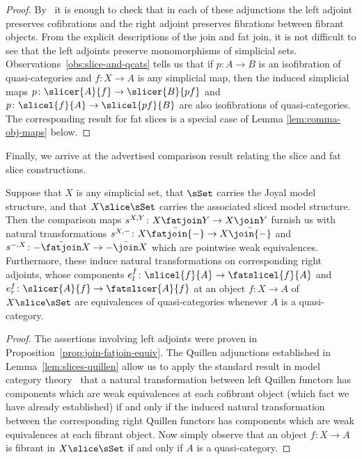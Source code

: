   \begin{proof}
    By~\cite[7.15]{Joyal:2007kk} it is enough to check that in each of these adjunctions the left adjoint preserves cofibrations and the right adjoint preserves fibrations between fibrant objects. From the explicit descriptions of the join and fat join, it is not difficult to see that the left adjoints preserve monomorphisms of simplicial sets. Observations~\ref{obs:slice-and-qcats} tells us that if $p \colon A \to B$ is an isofibration of quasi-categories and $f \colon X \to A$ is any simplicial map, then the induced simplicial maps $p\colon \slicer{A}{f}\to \slicer{B}{pf}$ and $p\colon \slicel{f}{A}\to \slicel{pf}{B}$ are also isofibrations of quasi-categories. The corresponding result for fat slices is a special case of Lemma \ref{lem:comma-obj-maps} below.%
  \end{proof}

  Finally, we arrive at the advertised comparison result relating the slice and fat slice constructions.
  
  \begin{prop}\label{prop:slice-fatslice-equiv}
    Suppose that $X$ is any simplicial set, that $\sSet$ carries the Joyal model structure, and that $X\slice\sSet$ carries the associated sliced model structure. Then the comparison maps $s^{X,Y}\colon X\fatjoin Y\to X\join Y$ furnish us with natural transformations $s^{X,{-}}\colon X\bar\fatjoin{-}\to X\bar\join{-}$ and $s^{{-},X}\colon {-}\bar\fatjoin X\to {-}\bar\join X$ which are pointwise weak equivalences. Furthermore, these induce natural transformations  on corresponding right adjoints, whose components $e_l^f\colon \slicel{f}{A}\to \fatslicel{f}{A} $ and $e_r^f\colon \slicer{A}{f}\to \fatslicer{A}{f}$ at an object $f\colon X\to A$ of $X\slice\sSet$ are equivalences of quasi-categories whenever $A$ is a quasi-category.
  \end{prop}
  
  \begin{proof}
    The assertions involving left adjoints were proven in Proposition~\ref{prop:join-fatjoin-equiv}. The Quillen adjunctions established in Lemma~\ref{lem:slices-quillen} allow us to apply the standard result in model category theory~\cite[1.4.4]{Hovey:1999fk} that a natural transformation between left Quillen functors has components which are weak equivalences at each cofibrant object (which fact we have already established) if and only if the  induced natural transformation between the corresponding right Quillen functors has components which are weak equivalences at each fibrant object. Now simply observe that an object $f\colon X\to A$ is fibrant in $X\slice\sSet$ if and only if $A$ is a quasi-category. 
  \end{proof}
  
